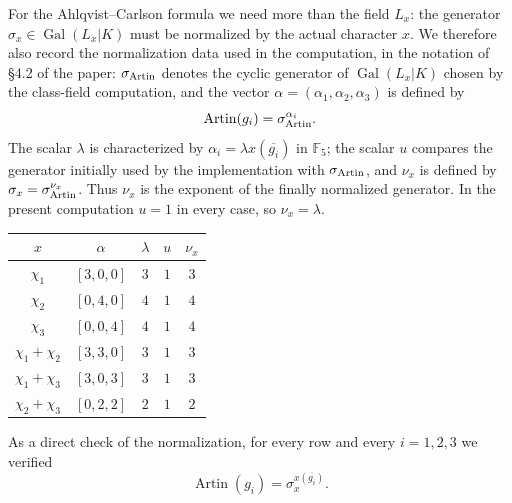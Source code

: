 \documentclass[11pt]{article}
\newcommand{\Ffive}{\mathbb F_5}
\newcommand{\Gal}{\operatorname{Gal}}
\begin{document}
For the Ahlqvist--Carlson formula we need more than the field $L_x$: the
generator $\sigma_x\in\Gal(L_x| K)$ must be normalized by the actual character
$x$.  We therefore also record the normalization data used in the computation,
in the notation of \S4.2 of the paper: $\sigma_{\rm Artin}$
denotes the cyclic generator of $\Gal(L_x| K)$ chosen by the class-field
computation, and the vector
$\alpha=(\alpha_1,\alpha_2,\alpha_3)$ is defined by
\[
  \operatorname{Artin}(g_i)
  =\sigma_{\rm Artin}^{\alpha_i}.
\]
The scalar $\lambda$ is characterized by
$\alpha_i=\lambda x(\overline{g_i})$ in $\Ffive$; the scalar $u$ compares the
generator initially used by the implementation with $\sigma_{\rm Artin}$,
and $\nu_x$ is defined by
$\sigma_x=\sigma_{\rm Artin}^{\nu_x}$.  Thus $\nu_x$ is the exponent of the
finally normalized generator.  In the present computation $u=1$ in every
case, so $\nu_x=\lambda$.
\begin{center}
\begin{tabular}{c c c c c}
\toprule
$x$ & $\alpha$ & $\lambda$ & $u$ & $\nu_x$ \\
\midrule
$\chi_1$   & $[3,0,0]$ & $3$ & $1$ & $3$ \\
$\chi_2$   & $[0,4,0]$ & $4$ & $1$ & $4$ \\
$\chi_3$   & $[0,0,4]$ & $4$ & $1$ & $4$ \\
$\chi_1{+}\chi_2$ & $[3,3,0]$ & $3$ & $1$ & $3$ \\
$\chi_1{+}\chi_3$ & $[3,0,3]$ & $3$ & $1$ & $3$ \\
$\chi_2{+}\chi_3$ & $[0,2,2]$ & $2$ & $1$ & $2$ \\
\bottomrule
\end{tabular}
\end{center}
As a direct check of the normalization, for every row and every
$i=1,2,3$ we verified
\[
  \operatorname{Artin}(g_i)
  =\sigma_x^{x(\overline{g_i})}.
\]
\end{document}

